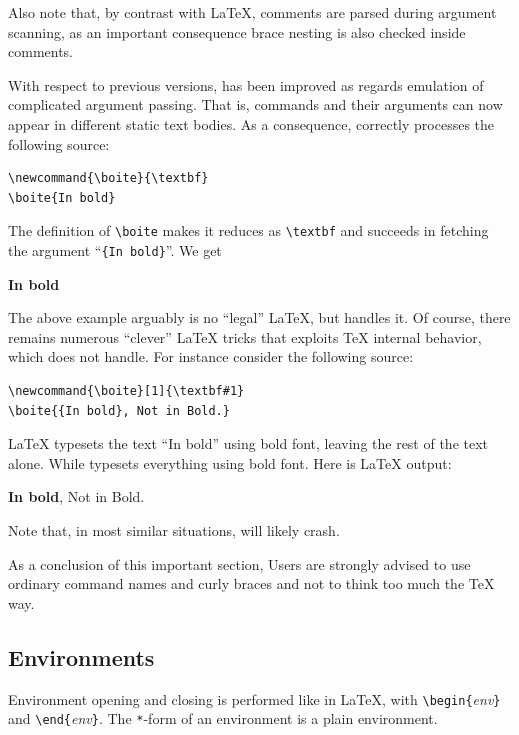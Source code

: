 Also note that, by contrast with \LaTeX{}, comments are parsed during
argument scanning, as an important consequence brace nesting is also
checked inside comments.

With respect to previous versions,
\hevea{} has been improved as regards emulation of complicated
argument passing. That is,
commands and their arguments can now appear in
different static text bodies. As a consequence,
\hevea{} correctly processes the following source:
\begin{verbatim}
\newcommand{\boite}{\textbf}
\boite{In bold}
\end{verbatim}
The definition of \verb+\boite+ makes it reduces as
\verb+\textbf+ and \hevea{} succeeds in fetching the argument
``\verb+{In bold}+''. We get
\begin{htmlout}
\newcommand{\boite}{\textbf}
\boite{In bold}
\end{htmlout}

The above example arguably is no ``legal'' \LaTeX{},
but \hevea{} handles it.
Of course, there remains
numerous ``clever'' \LaTeX{} tricks that exploits \TeX{} internal
behavior, which \hevea{} does not handle.
For instance consider the following source:
\begin{verbatim}
\newcommand{\boite}[1]{\textbf#1}
\boite{{In bold}, Not in Bold.}
\end{verbatim}
\LaTeX{} typesets the text ``In bold'' using bold font, leaving
the rest of the text alone. While \hevea{} typesets everything using
bold font. Here is \ifhevea\hevea\else\LaTeX\fi{} output:
\begin{htmlout}
\newcommand{\boite}[1]{\textbf#1}
\boite{{In bold}, Not in Bold.}
\end{htmlout}
Note that, in most similar situations, \hevea{} will likely crash.


As a conclusion of this important section,
Users are strongly advised to use ordinary command names and
curly braces and not to think too much the \TeX{} way.




\subsection{Environments}

Environment opening and closing is performed like in \LaTeX{}, with
\verb+\begin{+\textit{env}\verb+}+ and
\verb+\end{+\textit{env}\verb+}+.
The \verb+*+-form of an environment is a plain environment.

